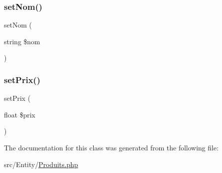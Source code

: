 \subsubsection{\texorpdfstring{set\+Nom()}{setNom()}}
{\footnotesize\ttfamily set\+Nom (\begin{DoxyParamCaption}\item[{string}]{\$nom }\end{DoxyParamCaption})}

\mbox{\label{class_app_1_1_entity_1_1_produits_a85091a25a9a780dfb7dca7cbf27b3a92}} 
\subsubsection{\texorpdfstring{set\+Prix()}{setPrix()}}
{\footnotesize\ttfamily set\+Prix (\begin{DoxyParamCaption}\item[{float}]{\$prix }\end{DoxyParamCaption})}



The documentation for this class was generated from the following file\+:\begin{DoxyCompactItemize}
\item 
src/\+Entity/\mbox{\hyperlink{_produits_8php}{Produits.\+php}}\end{DoxyCompactItemize}
